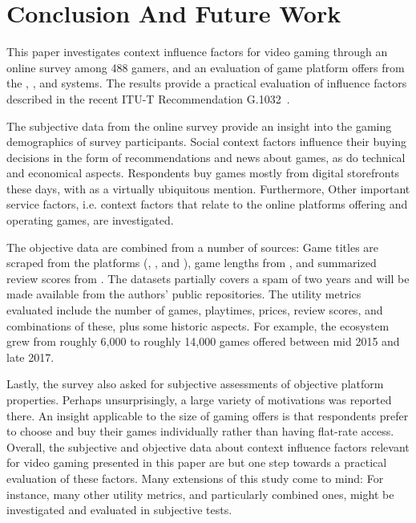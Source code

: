 \section{Conclusion And Future Work}
\label{sec:conclusion}

This paper investigates context influence factors for video gaming
through an online survey among 488 gamers, and an evaluation of
game platform offers from the \steam, \psnow, and \gfnow systems.
The results provide a practical evaluation of influence factors
described in the recent \acrshort{ITU-T} Recommendation
G.1032~\cite{itutg1032}.

The subjective data from the online survey provide an insight into
the gaming demographics of survey participants.
Social context factors influence their buying decisions in the
form of recommendations and news about games, as do technical and
economical aspects.
Respondents buy games mostly from digital storefronts these days,
with \steam as a virtually ubiquitous mention.
Furthermore, Other important service factors, i.e. context factors
that relate to the online platforms offering and operating games,
are investigated.

The objective data are combined from a number of sources:
Game titles are scraped from the platforms (\gfnow, \psnow, and \steam),
game lengths from \hltb, and summarized review scores from
\metacritic.
The datasets partially covers a spam of two years and will
be made available from the authors' public repositories.
The utility metrics evaluated include the number
of games, playtimes, prices, review scores, and combinations of these,
plus some historic aspects.
For example, the \steam ecosystem grew from roughly 6,000 to roughly
14,000 games offered between mid 2015 and late 2017.

Lastly, the survey also asked for subjective assessments of objective
platform properties. Perhaps unsurprisingly, a large variety of
motivations was reported there. An insight applicable to the size
of gaming offers is that respondents prefer to choose and buy their 
games individually rather than having flat-rate access.\\

Overall, the subjective and objective data about context influence
factors relevant for video gaming presented in this paper are but
one step towards a practical evaluation of these factors.
Many extensions of this study come to mind:
For instance, many other utility metrics, and
particularly combined ones, might be investigated and evaluated
in subjective tests.

